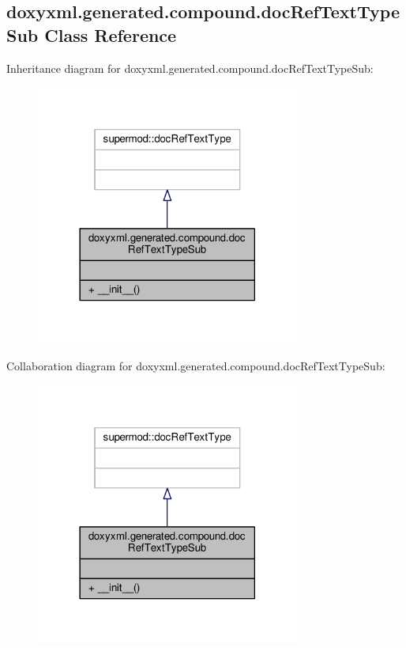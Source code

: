 \subsection{doxyxml.\+generated.\+compound.\+doc\+Ref\+Text\+Type\+Sub Class Reference}
\label{classdoxyxml_1_1generated_1_1compound_1_1docRefTextTypeSub}


Inheritance diagram for doxyxml.\+generated.\+compound.\+doc\+Ref\+Text\+Type\+Sub\+:
\nopagebreak
\begin{figure}[H]
\begin{center}
\leavevmode
\includegraphics[width=246pt]{d0/d4d/classdoxyxml_1_1generated_1_1compound_1_1docRefTextTypeSub__inherit__graph}
\end{center}
\end{figure}


Collaboration diagram for doxyxml.\+generated.\+compound.\+doc\+Ref\+Text\+Type\+Sub\+:
\nopagebreak
\begin{figure}[H]
\begin{center}
\leavevmode
\includegraphics[width=246pt]{d3/da5/classdoxyxml_1_1generated_1_1compound_1_1docRefTextTypeSub__coll__graph}
\end{center}
\end{figure}
